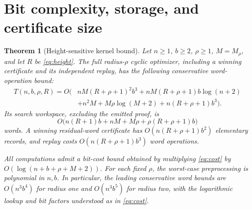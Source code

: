 \documentclass[11pt,a4paper]{article}
\newtheorem{theorem}{Theorem}[section]
\theoremstyle{definition}\newtheorem{definition}[theorem]{Definition}
\theoremstyle{remark}\newtheorem{remark}[theorem]{Remark}
\begin{document}
\section{Bit complexity, storage, and certificate size}

\begin{theorem}[Height-sensitive kernel bound]\label{thm:cost}
Let $n\ge1$, $b\ge2$, $\rho\ge1$, $M=M_\rho$, and let $R$ be
\eqref{eq:height}. The full radius-$\rho$ cyclic optimizer, including a
winning certificate and its independent replay, has the following
conservative word-operation bound:
\begin{align}
 T(n,b,\rho,R)=O\bigl(&nM(R+\rho+1)^2b^3
       +nM(R+\rho+1)b\log(n+2)\nonumber\\
       &+n^2M+M\rho\log(M+2)
       +n(R+\rho+1)b^3\bigr).\label{eq:cost}
\end{align}
Its search workspace, excluding the emitted proof, is
\begin{equation}\label{eq:space}
 O\bigl(n(R+1)b+nM+M\rho+\rho(R+\rho+1)b\bigr)
\end{equation}
words. A winning residual-word certificate has
$O(n(R+\rho+1)b^2)$ elementary records, and replay costs
$O(n(R+\rho+1)b^3)$ word operations.

All computations admit a bit-cost bound obtained by multiplying
\eqref{eq:cost} by
$O(\log(n+b+\rho+M+2))$. For each fixed $\rho$, the worst-case preprocessing
is polynomial in $n,b$. In particular, the leading conservative word bounds
are $O(n^3b^4)$ for radius one and $O(n^3b^5)$ for radius two, with the
logarithmic lookup and bit factors understood as in \eqref{eq:cost}.
\end{theorem}
\end{document}
